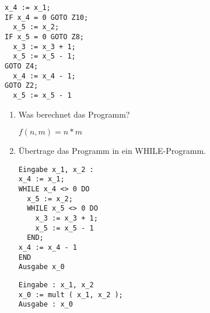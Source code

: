 \documentclass{lehramt-informatik-aufgabe}
\begin{document}
\begin{enumerate}
\begin{verbatim}
x_4 := x_1;
IF x_4 = 0 GOTO Z10;
  x_5 := x_2;
IF x_5 = 0 GOTO Z8;
  x_3 := x_3 + 1;
  x_5 := x_5 - 1;
GOTO Z4;
  x_4 := x_4 - 1;
GOTO Z2;
  x_5 := x_5 - 1
\end{verbatim}
\begin{enumerate}


\item Was berechnet das Programm?

\begin{liAntwort}
$f(n, m) = n * m$
\end{liAntwort}


\item Übertrage das Programm in ein WHILE-Programm.

\begin{liAntwort}
\begin{verbatim}
Eingabe x_1, x_2 :
x_4 := x_1;
WHILE x_4 <> 0 DO
  x_5 := x_2;
  WHILE x_5 <> 0 DO
    x_3 := x_3 + 1;
    x_5 := x_5 - 1
  END;
x_4 := x_4 - 1
END
Ausgabe x_0

\end{verbatim}

\begin{verbatim}
Eingabe : x_1, x_2
x_0 := mult ( x_1, x_2 );
Ausgabe : x_0
\end{verbatim}
\end{liAntwort}
\end{enumerate}

\end{enumerate}
\end{document}
